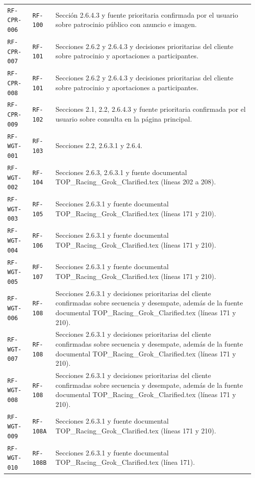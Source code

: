 \documentclass[10pt,letterpaper]{article}
\begin{document}
\begin{landscape}
\begin{longtable}{P{2.7cm}P{2.6cm}P{15.7cm}}
\texttt{RF-CPR-006} & \texttt{RF-100} & Sección 2.6.4.3 y fuente prioritaria confirmada por el usuario sobre patrocinio público con anuncio e imagen.\\
\texttt{RF-CPR-007} & \texttt{RF-101} & Secciones 2.6.2 y 2.6.4.3 y decisiones prioritarias del cliente sobre patrocinio y aportaciones a participantes.\\
\texttt{RF-CPR-008} & \texttt{RF-101} & Secciones 2.6.2 y 2.6.4.3 y decisiones prioritarias del cliente sobre patrocinio y aportaciones a participantes.\\
\texttt{RF-CPR-009} & \texttt{RF-102} & Secciones 2.1, 2.2, 2.6.4.3 y fuente prioritaria confirmada por el usuario sobre consulta en la página principal.\\
\texttt{RF-WGT-001} & \texttt{RF-103} & Secciones 2.2, 2.6.3.1 y 2.6.4.\\
\texttt{RF-WGT-002} & \texttt{RF-104} & Secciones 2.6.3, 2.6.3.1 y fuente documental TOP\_Racing\_Grok\_Clarified.tex (líneas 202 a 208).\\
\texttt{RF-WGT-003} & \texttt{RF-105} & Secciones 2.6.3.1 y fuente documental TOP\_Racing\_Grok\_Clarified.tex (líneas 171 y 210).\\
\texttt{RF-WGT-004} & \texttt{RF-106} & Secciones 2.6.3.1 y fuente documental TOP\_Racing\_Grok\_Clarified.tex (líneas 171 y 210).\\
\texttt{RF-WGT-005} & \texttt{RF-107} & Secciones 2.6.3.1 y fuente documental TOP\_Racing\_Grok\_Clarified.tex (líneas 171 y 210).\\
\texttt{RF-WGT-006} & \texttt{RF-108} & Secciones 2.6.3.1 y decisiones prioritarias del cliente confirmadas sobre secuencia y desempate, además de la fuente documental TOP\_Racing\_Grok\_Clarified.tex (líneas 171 y 210).\\
\texttt{RF-WGT-007} & \texttt{RF-108} & Secciones 2.6.3.1 y decisiones prioritarias del cliente confirmadas sobre secuencia y desempate, además de la fuente documental TOP\_Racing\_Grok\_Clarified.tex (líneas 171 y 210).\\
\texttt{RF-WGT-008} & \texttt{RF-108} & Secciones 2.6.3.1 y decisiones prioritarias del cliente confirmadas sobre secuencia y desempate, además de la fuente documental TOP\_Racing\_Grok\_Clarified.tex (líneas 171 y 210).\\
\texttt{RF-WGT-009} & \texttt{RF-108A} & Secciones 2.6.3.1 y fuente documental TOP\_Racing\_Grok\_Clarified.tex (líneas 171 y 210).\\
\texttt{RF-WGT-010} & \texttt{RF-108B} & Secciones 2.6.3.1 y fuente documental TOP\_Racing\_Grok\_Clarified.tex (línea 171).\\

\end{longtable}
\end{landscape}
\end{document}
